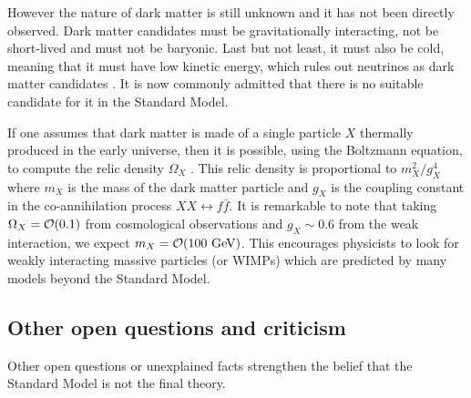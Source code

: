     However the nature of dark matter is still unknown and it has not been directly observed.
    Dark matter candidates must be gravitationally interacting,
    not be short-lived and must not be baryonic. Last but not least, it must also be
    cold, meaning that it must have low kinetic energy, which rules out neutrinos
    as dark matter candidates \cite{NeutrinoNotDM}. It is now commonly admitted that there is no suitable
    candidate for it in the Standard Model.

    If one assumes that dark matter is made of a single particle $X$ thermally produced
    in the early universe, then it is possible, using the Boltzmann equation, to compute
    the relic density $\Omega_X$ \cite{DMPrimer, NeutralinoRelic, WIMPRelic}. This
    relic density is proportional to $m_X^2 / g^4_X$ where $m_X$ is the mass of the dark matter particle
    and $g_X$ is the coupling constant in the co-annihilation process $XX \leftrightarrow f\bar{f}$.
    It is remarkable to note that taking $\Omega_X = \mathcal{O}(0.1)$ from cosmological
    observations and $g_X \sim 0.6$ from the weak interaction, we expect $m_X =
    \mathcal{O}(100~\text{GeV})$. This encourages physicists to look for weakly interacting massive
    particles (or WIMPs) which are predicted by many models beyond the Standard Model.

        \subsection{Other open questions and criticism}

    Other open questions or unexplained facts strengthen the belief that the Standard Model
    is not the final theory.

